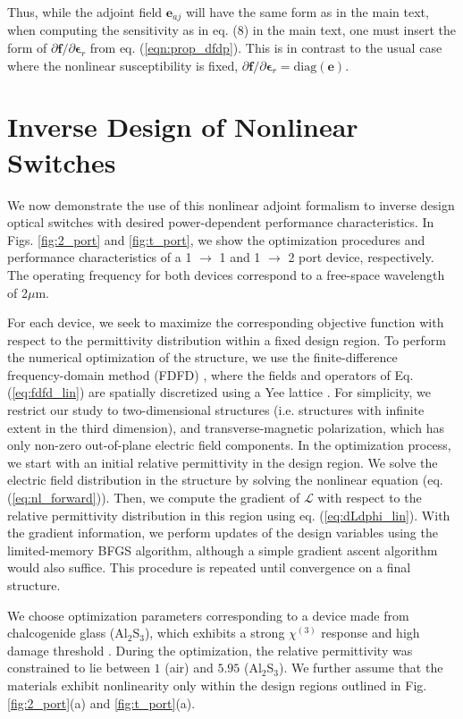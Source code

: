 Thus, while the adjoint field $\mathbf{e}_{aj}$ will have the same form as in the main text, when computing the sensitivity as in eq. (8) in the main text, one must insert the form of $\partial \mathbf{f} / \partial \bm{\epsilon}_r$ from eq. (\ref{eqn:prop_dfdp}).  This is in contrast to the usual case where the nonlinear susceptibility is fixed, $\partial \mathbf{f} / \partial \bm{\epsilon}_r = \textrm{diag}\left( \mathbf{e} \right)$.


\section{Inverse Design of Nonlinear Switches}


We now demonstrate the use of this nonlinear adjoint formalism to inverse design optical switches with desired power-dependent performance characteristics.  In Figs. \ref{fig:2_port} and \ref{fig:t_port}, we show the optimization procedures and performance characteristics of a 1 $\to$ 1 and 1 $\to$ 2 port device, respectively. The operating frequency for both devices correspond to a free-space wavelength of 2$\mu$m. 

For each device, we seek to maximize the corresponding objective function with respect to the permittivity distribution within a fixed design region.  To perform the numerical optimization of the structure, we use the finite-difference frequency-domain method (FDFD) \cite{shin2012choice}, where the fields and operators of Eq. (\ref{eq:fdfd_lin}) are spatially discretized using a Yee lattice \cite{yee1966numerical}. For simplicity, we restrict our study to two-dimensional structures (i.e. structures with infinite extent in the third dimension), and transverse-magnetic polarization, which has only non-zero out-of-plane electric field components. In the optimization process, we start with an initial relative permittivity in the design region.  We solve the electric field distribution in the structure by solving the nonlinear equation (eq. (\ref{eq:nl_forward})).  Then, we compute the gradient of $\mathcal{L}$ with respect to the relative permittivity distribution in this region using eq. (\ref{eq:dLdphi_lin}).  With the gradient information, we perform updates of the design variables using the limited-memory BFGS \cite{byrd1995limited} algorithm, although a simple gradient ascent algorithm would also suffice.  This procedure is repeated until convergence on a final structure. 

We choose optimization parameters corresponding to a device made from chalcogenide glass (Al$_2$S$_3$), which exhibits a strong $\chi^{(3)}$ response and high damage threshold \cite{White_OptLett_2011,Lamont_OptExpress_2008,Boyd__2008}.  During the optimization, the relative permittivity was constrained to lie between $1$ (air) and $5.95$ (Al$_2$S$_3$).  We further assume that the materials exhibit nonlinearity only within the design regions outlined in Fig. \ref{fig:2_port}(a) and \ref{fig:t_port}(a).


